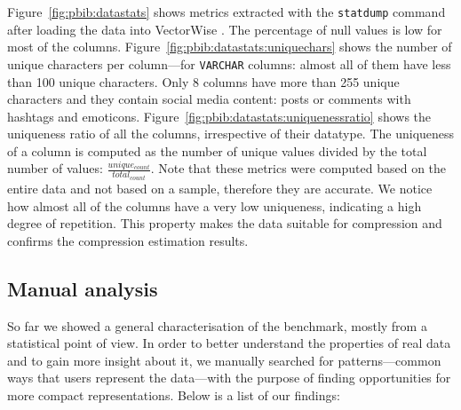 Figure~\ref{fig:pbib:datastats} shows metrics extracted with the \verb|statdump| command after loading the data into VectorWise \cite{zukowski2012vectorwise}. The percentage of null values is low for most of the columns. Figure~\ref{fig:pbib:datastats:uniquechars} shows the number of unique characters per column---for \verb|VARCHAR| columns: almost all of them have less than 100 unique characters. Only 8 columns have more than 255 unique characters and they contain social media content: posts or comments with hashtags and emoticons. Figure~\ref{fig:pbib:datastats:uniquenessratio} shows the uniqueness ratio of all the columns, irrespective of their datatype. The uniqueness of a column is computed as the number of unique values divided by the total number of values: \(\frac{unique_{count}}{total_{count}}\). Note that these metrics were computed based on the entire data and not based on a sample, therefore they are accurate. We notice how almost all of the columns have a very low uniqueness, indicating a high degree of repetition. This property makes the data suitable for compression and confirms the compression estimation results.

\subsection{Manual analysis}
So far we showed a general characterisation of the benchmark, mostly from a statistical point of view. In order to better understand the properties of real data and to gain more insight about it, we manually searched for patterns---common ways that users represent the data---with the purpose of finding opportunities for more compact representations. Below is a list of our findings:

